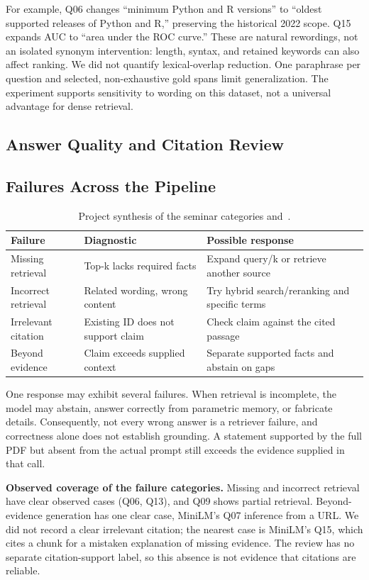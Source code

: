 \documentclass[12pt,a4paper]{article}
\begin{document}
For example, Q06 changes ``minimum Python and R versions'' to ``oldest supported releases of Python and R,'' preserving the historical 2022 scope. Q15 expands AUC to ``area under the ROC curve.'' These are natural rewordings, not an isolated synonym intervention: length, syntax, and retained keywords can also affect ranking. We did not quantify lexical-overlap reduction. One paraphrase per question and selected, non-exhaustive gold spans limit generalization. The experiment supports sensitivity to wording on this dataset, not a universal advantage for dense retrieval.

\newpage
\subsection*{Answer Quality and Citation Review}


\subsection*{Failures Across the Pipeline}
\begin{table}[H]\centering\small
\begin{tabularx}{\linewidth}{p{2.7cm}XX}\toprule
Failure & Diagnostic & Possible response\\\midrule
Missing retrieval & Top-k lacks required facts & Expand query/k or retrieve another source\\
Incorrect retrieval & Related wording, wrong content & Try hybrid search/reranking and specific terms\\
Irrelevant citation & Existing ID does not support claim & Check claim against the cited passage\\
Beyond evidence & Claim exceeds supplied context & Separate supported facts and abstain on gaps\\\bottomrule
\end{tabularx}
\caption{Project synthesis of the seminar categories and~\cite{schneider}.}
\end{table}
One response may exhibit several failures. When retrieval is incomplete, the model may abstain, answer correctly from parametric memory, or fabricate details. Consequently, not every wrong answer is a retriever failure, and correctness alone does not establish grounding. A statement supported by the full PDF but absent from the actual prompt still exceeds the evidence supplied in that call.

\textbf{Observed coverage of the failure categories.} Missing and incorrect retrieval have clear observed cases (Q06, Q13), and Q09 shows partial retrieval. Beyond-evidence generation has one clear case, MiniLM's Q07 inference from a URL. We did not record a clear irrelevant citation; the nearest case is MiniLM's Q15, which cites a chunk for a mistaken explanation of missing evidence. The review has no separate citation-support label, so this absence is not evidence that citations are reliable.
\end{document}
